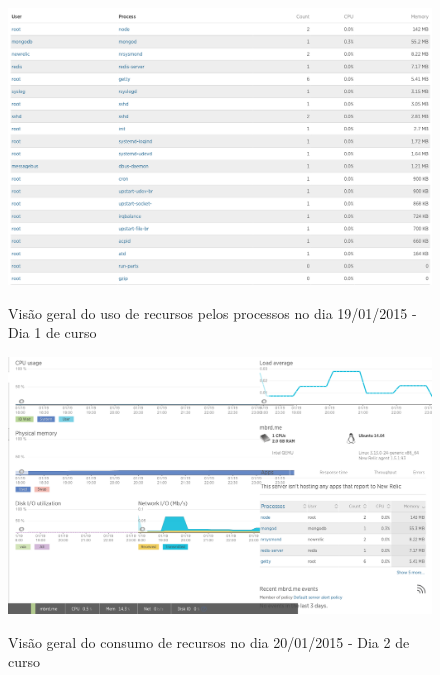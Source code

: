 \documentclass[
	12pt,				%
	oneside,			%
	a4paper,			%
	english,			%
	brazil				%
	]{abntex2ppgsi}
\begin{document}
\begin{apendicesenv}
\begin{figure}[h]
\centering
\caption{Visão geral do uso de recursos pelos processos no dia 19/01/2015 - Dia 1 de curso}
\includegraphics[page=2,width=1.0\textwidth]{relatorios/19-01-15/process-inspector_cropped.pdf} 
\label{fig:recursos_dia1_5} 
\end{figure}



\begin{figure}[h]
\centering
\caption{Visão geral do consumo de recursos no dia 20/01/2015 - Dia 2 de curso}
\includegraphics[width=1.0\textwidth]{relatorios/20-01-15/dashboard_cropped.pdf} 
\label{fig:recursos_dia2_1}
\end{figure}




\end{apendicesenv}
\end{document}
